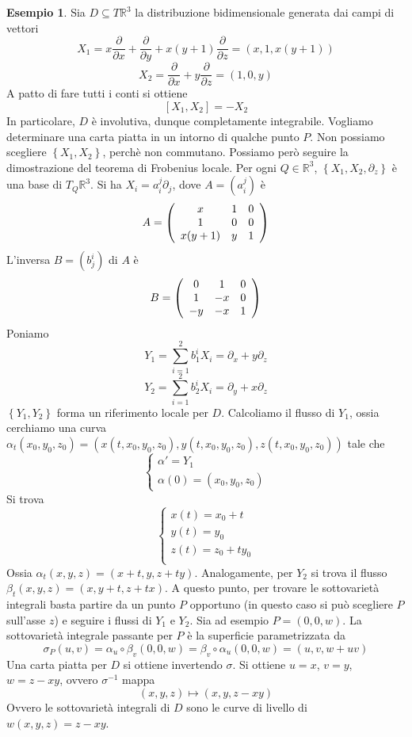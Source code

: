 \documentclass[a4paper,11pt]{article}
\theoremstyle{definition}
\newtheorem{esempio}{Esempio}[section]
\theoremstyle{theorem}
\newcommand{\R}{\mathbb{R}}
\begin{document}
\begin{esempio}
	Sia $D\subseteq T\R^3$ la distribuzione bidimensionale generata dai campi di vettori
	\[X_1=x\frac{\partial}{\partial x}+\frac{\partial}{\partial y}+x(y+1)\frac{\partial}{\partial z}=(x,1,x(y+1))\]
	\[X_2=\frac{\partial}{\partial x}+y\frac{\partial}{\partial z}=(1,0,y)\]
	A patto di fare tutti i conti si ottiene
	\[[X_1,X_2]=-X_2\]
	In particolare, $D$ è involutiva, dunque completamente integrabile. Vogliamo determinare una carta piatta in un intorno di qualche punto $P$. Non possiamo scegliere $\left\{X_1,X_2\right\}$, perchè non commutano. Possiamo però seguire la dimostrazione del teorema di Frobenius locale. Per ogni $Q\in\R^3$, $\left\{X_1,X_2,\partial_z\right\}$ è una base di $T_Q\R^3$. Si ha $X_i=a_i^j\partial_j$, dove $A=\left(a_i^j\right)$ è
	\[A=\left(\begin{array}{c c c}
	x&1&0\\
	1&0&0\\
	x(y+1)&y&1
	\end{array}\right)\]
	L'inversa $B=\left(b_j^i\right)$ di $A$ è
	\[B=\left(\begin{array}{c c c}
	0&1&0\\1&-x&0\\-y&-x&1
	\end{array}\right)\]
	Poniamo
	\[Y_1=\sum_{i=1}^{2}b_1^iX_i=\partial_x+y\partial_z\]
	\[Y_2=\sum_{i=1}^{2}b_2^iX_i=\partial_y+x\partial_z\]
	$\left\{Y_1,Y_2\right\}$ forma un riferimento locale per $D$. Calcoliamo il flusso di $Y_1$, ossia cerchiamo una curva $\alpha_t(x_0,y_0,z_0)=(x(t,x_0,y_0,z_0),y(t,x_0,y_0,z_0),z(t,x_0,y_0,z_0))$ tale che
	\[\left\{\begin{array}{l}
	\alpha'=Y_1\\
	\alpha(0)=(x_0,y_0,z_0)
	\end{array}\right.\]
	Si trova
	\[\left\{\begin{array}{l}
	x(t)=x_0+t\\
	y(t)=y_0\\
	z(t)=z_0+ty_0\\
	\end{array}\right.\]
	Ossia $\alpha_t(x,y,z)=(x+t,y,z+ty)$. Analogamente, per $Y_2$ si trova il flusso $\beta_t(x,y,z)=(x,y+t,z+tx)$. A questo punto, per trovare le sottovarietà integrali basta partire da un punto $P$ opportuno (in questo caso si può scegliere $P$ sull'asse $z$) e seguire i flussi di $Y_1$ e $Y_2$. Sia ad esempio $P=(0,0,w)$. La sottovarietà integrale passante per $P$ è la superficie parametrizzata da
	\[\sigma_P(u,v)=\alpha_u\circ\beta_v(0,0,w)=\beta_v\circ\alpha_u(0,0,w)=(u,v,w+uv)\]
	Una carta piatta per $D$ si ottiene invertendo $\sigma$. Si ottiene $u=x$, $v=y$, $w=z-xy$, ovvero $\sigma^{-1}$ mappa
	\[(x,y,z)\mapsto(x,y,z-xy)\]
	Ovvero le sottovarietà integrali di $D$ sono le curve di livello di $w(x,y,z)=z-xy$.
\end{esempio}
\end{document}
